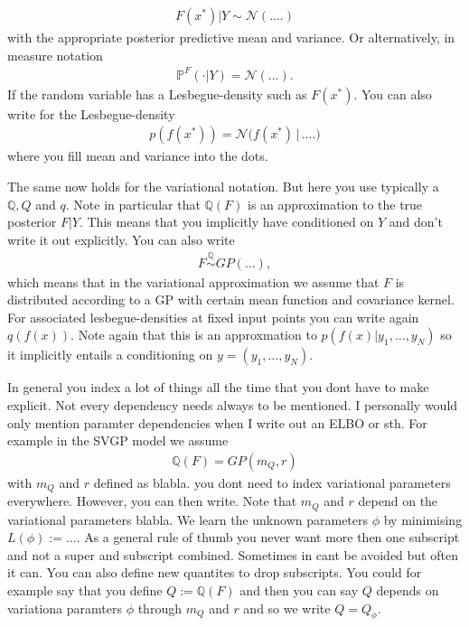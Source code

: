 \documentclass{article}
\numberwithin{equation}{section}
\begin{document}
\begin{align}
    F(x^*) | Y \sim \mathcal{N}(....)
\end{align}
with the appropriate posterior predictive mean and variance. Or alternatively, in measure notation
\begin{align}
    \mathbb{P}^F( \cdot| Y) = \mathcal{N}(...).
\end{align}
If the random variable has a Lesbegue-density such as $F(x^*)$. You can also write for the Lesbegue-density
\begin{align}
    p( f(x^*) ) = \mathcal{N} \big( f(x^*) \, | \, ....)
\end{align}
where you fill mean and variance into the dots.

The same now holds for the variational notation. But here you use typically a $\mathbb{Q},Q$ and $q$. Note in particular that $\mathbb{Q}(F)$ is an approximation to the true posterior $F | Y$. This means that you implicitly have conditioned on $Y$ and don't write it out explicitly. You can also write
\begin{align}
    F \overset{\mathbb{Q}}{\sim} GP(...),
\end{align}
which means that in the variational approximation we assume that $F$ is distributed according to a GP with certain mean function and covariance kernel. For associated lesbegue-densities at fixed input points you can write again $q(f(x))$. Note again that this is an approxmation to $p(f(x)|y_1, \hdots, y_N)$ so it implicitly entails a conditioning on $y=(y_1, \hdots, y_N)$.

In general you index a lot of things all the time that you dont have to make explicit. Not every dependency needs always to be mentioned. I personally would only mention paramter dependencies when I write out an ELBO or sth. For example in the SVGP model we assume
\begin{align}
    \mathbb{Q}(F) = GP( m_Q, r)
\end{align}
with $m_Q$ and $r$ defined as blabla. you dont need to index variational parameters everywhere. However, you can then write. Note that $m_Q$ and $r$ depend on the variational parameters blabla. We learn the unknown parameters $\phi$ by minimising $L(\phi) := ...$. As a general rule of thumb you never want more then one subscript and not a super and subscript combined. Sometimes in cant be avoided but often it can. You can also define new quantites to drop subscripts. You could for example say that you define $Q := \mathbb{Q}(F)$ and then you can say $Q$ depends on variationa paramters $\phi$ through $m_Q$ and $r$ and so we write $Q = Q_\phi$.
\end{document}
